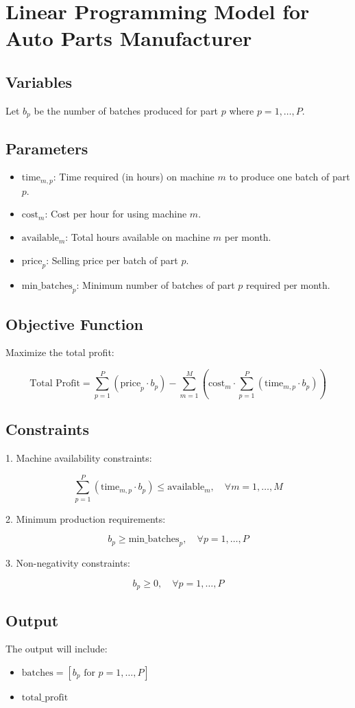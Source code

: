\documentclass{article}
\begin{document}
\section*{Linear Programming Model for Auto Parts Manufacturer}

\subsection*{Variables}
Let \( b_p \) be the number of batches produced for part \( p \) where \( p = 1, \ldots, P \).

\subsection*{Parameters}
\begin{itemize}
    \item \( \text{time}_{m,p} \): Time required (in hours) on machine \( m \) to produce one batch of part \( p \).
    \item \( \text{cost}_{m} \): Cost per hour for using machine \( m \).
    \item \( \text{available}_{m} \): Total hours available on machine \( m \) per month.
    \item \( \text{price}_{p} \): Selling price per batch of part \( p \).
    \item \( \text{min\_batches}_{p} \): Minimum number of batches of part \( p \) required per month.
\end{itemize}

\subsection*{Objective Function}
Maximize the total profit:

\[
\text{Total Profit} = \sum_{p=1}^{P} \left( \text{price}_{p} \cdot b_p \right) - \sum_{m=1}^{M} \left( \text{cost}_{m} \cdot \sum_{p=1}^{P} \left( \text{time}_{m,p} \cdot b_p \right) \right)
\]

\subsection*{Constraints}
1. Machine availability constraints:

\[
\sum_{p=1}^{P} \left( \text{time}_{m,p} \cdot b_p \right) \leq \text{available}_{m}, \quad \forall m = 1, \ldots, M
\]

2. Minimum production requirements:

\[
b_p \geq \text{min\_batches}_{p}, \quad \forall p = 1, \ldots, P
\]

3. Non-negativity constraints:

\[
b_p \geq 0, \quad \forall p = 1, \ldots, P
\]

\subsection*{Output}
The output will include:
\begin{itemize}
    \item \( \text{batches} = [b_p \text{ for } p = 1, \ldots, P] \)
    \item \( \text{total\_profit} \)
\end{itemize}
\end{document}

